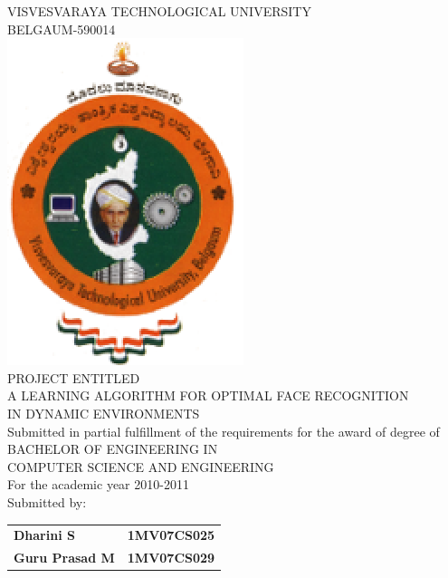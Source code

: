 \documentclass{article}
[10pt,a4paper]
\newcommand{\tab}{\hspace*{8 cm}}
\begin{document}
\begin{center}
\thispagestyle{empty}

\large{VISVESVARAYA TECHNOLOGICAL UNIVERSITY \\ BELGAUM-590014 } \\
\vspace{1mm}
\includegraphics{mspicture.eps}
\vspace{2mm}
\\
\normalsize{PROJECT ENTITLED}\\
\vspace{2mm}
\Large{A LEARNING ALGORITHM FOR OPTIMAL FACE RECOGNITION \\ IN DYNAMIC ENVIRONMENTS}\\
\vspace{3mm}
\normalsize{Submitted in partial fulfillment of the requirements for the award of degree of \\}
\vspace{1mm}
\large{BACHELOR OF ENGINEERING IN }\\
\large{COMPUTER SCIENCE AND ENGINEERING}\\
\vspace{1mm}
\normalsize{For the academic year 2010-2011\\}
\vspace{3mm}
\large{Submitted by:} \\
\begin{table}[h]
\begin{tabular}{lr}
\normalsize\textbf{Dharini S} \tab & \textbf{1MV07CS025}   \\
\normalsize\textbf{Guru Prasad M} \tab & \textbf{1MV07CS029}   \\

\end{tabular}
\end{table}
\end{center}
\end{document}
